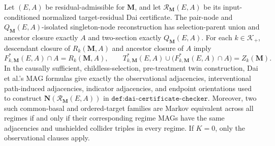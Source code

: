 Let \((E,A)\) be residual-admissible for \(\mathbf M\), and let \(\mathcal R_{\mathbf M}(E,A)\) be its input-conditioned normalized target-residual Dai certificate.  The pair-node and \(Q_{\mathbf M}(E,A)\)-isolated singleton-node reconstruction has selection-parent union and ancestor closure exactly \(A\) and two-section exactly \(Q_{\mathbf M}(E,A)\).  For each \(k\in\mathcal K_+\), descendant closure of \(R_k(\mathbf M,A)\) and ancestor closure of \(A\) imply
\[
F^*_{k,\mathbf M}(E,A)\cap A=R_k(\mathbf M,A),
\qquad
T^*_{k,\mathbf M}(E,A)\cup\bigl(F^*_{k,\mathbf M}(E,A)\cap A\bigr)=Z_k(\mathbf M).
\]
In the causally sufficient, childless-selection, pre-treatment twin construction, Dai et al.'s MAG formulas give exactly the observational adjacencies, interventional path-induced adjacencies, indicator adjacencies, and endpoint orientations used to construct \(\mathbf N(\mathcal R_{\mathbf M}(E,A))\) in \(\texttt{def:dai-certificate-checker}\).  Moreover, two such common-basal and ordered-target families are Markov equivalent across all regimes if and only if their corresponding regime MAGs have the same adjacencies and unshielded collider triples in every regime.  If \(K=0\), only the observational clauses apply.